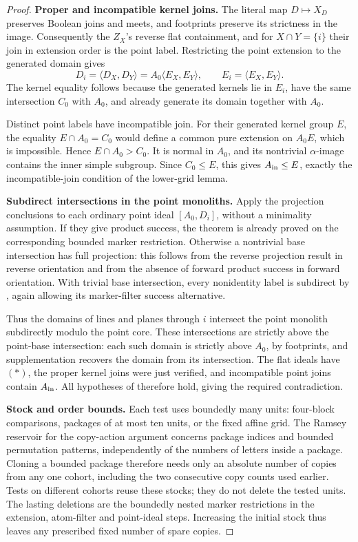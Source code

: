 \begin{proof}
\noindent\textbf{Proper and incompatible kernel joins.}
The literal map \(D\mapsto X_D\) preserves Boolean joins and meets,
and footprints preserve its strictness in the image.  Consequently
the \(Z_X\)'s reverse flat containment, and for \(X\cap Y=\{i\}\)
their join in extension order is the point label.  Restricting the
point extension to the generated domain gives
\[
 D_i=\langle D_X,D_Y\rangle
     =A_0\langle E_X,E_Y\rangle,
 \qquad E_i=\langle E_X,E_Y\rangle.
\]
The kernel equality follows because the generated kernels lie in
\(E_i\), have the same intersection \(C_0\) with \(A_0\), and
already generate its domain together with \(A_0\).

Distinct point labels have incompatible join.  For their generated
kernel group \(E\), the equality \(E\cap A_0=C_0\) would define a
common pure extension on \(A_0E\), which is impossible.  Hence
\(E\cap A_0>C_0\).  It is normal in \(A_0\), and its nontrivial
\(\alpha\)-image contains the inner simple subgroup.  Since
\(C_0\le E\), this gives \(A_{\rm in}\le E\), exactly the
incompatible-join condition of the lower-grid lemma.

\noindent\textbf{Subdirect intersections in the point monoliths.}
Apply the projection conclusions to each ordinary point ideal
\([A_0,D_i]\), without a minimality assumption.  If they give product
success, the theorem is already proved on the corresponding bounded
marker restriction.  Otherwise a nontrivial base intersection has
full projection: this follows from the reverse projection result in
reverse orientation and from the absence of forward product success
in forward orientation.  With trivial base intersection, every
nonidentity label is subdirect by
, again allowing its marker-filter
success alternative.

Thus the domains of lines and planes through \(i\) intersect the
point monolith subdirectly modulo the point core.  These intersections
are strictly above the point-base intersection: each such domain is
strictly above \(A_0\), by footprints, and supplementation recovers
the domain from its intersection.  The flat ideals have \((*)\),
the proper kernel joins were just verified, and incompatible point
joins contain \(A_{\rm in}\).  All hypotheses of
 therefore hold, giving the required contradiction.

\noindent\textbf{Stock and order bounds.}
Each test uses boundedly many units: four-block comparisons, packages
of at most ten units, or the fixed affine grid.  The Ramsey reservoir
for the copy-action argument concerns package indices and bounded
permutation patterns, independently of the numbers of letters inside
a package.  Cloning a bounded package therefore needs only an absolute
number of copies from any one cohort, including the two consecutive
copy counts used earlier.  Tests on different cohorts reuse these
stocks; they do not delete the tested units.  The lasting deletions
are the boundedly nested marker restrictions in the extension,
atom-filter and point-ideal steps.  Increasing the initial stock thus
leaves any prescribed fixed number of spare copies.


\end{proof}
